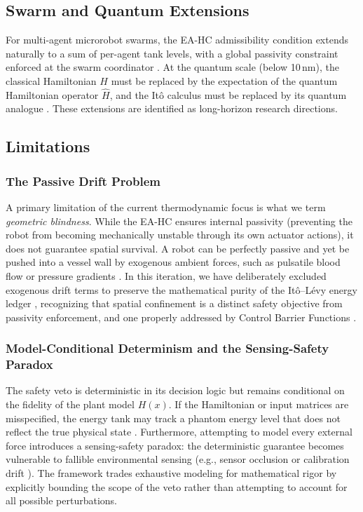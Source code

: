 \documentclass[11pt]{article}
\begin{document}
\subsection{Swarm and Quantum Extensions}

For multi-agent microrobot swarms, the EA-HC admissibility condition extends naturally to a
sum of per-agent tank levels, with a global passivity constraint enforced at the swarm
coordinator \cite{vanderschaft2014,wang2017}. At the quantum scale (below 10\,nm), the
classical Hamiltonian $H$ must be replaced by the expectation of the quantum Hamiltonian
operator $\hat{H}$, and the It\^{o} calculus must be replaced by its quantum analogue
\cite{hudson1984}. These extensions are identified as long-horizon research directions.

\subsection{Limitations}

\subsubsection{The Passive Drift Problem}
\label{sec:drift}

A primary limitation of the current thermodynamic focus is what we term \emph{geometric
blindness}. While the EA-HC ensures internal passivity (preventing the robot from becoming
mechanically unstable through its own actuator actions), it does not guarantee spatial survival.
A robot can be perfectly passive and yet be pushed into a vessel wall by exogenous ambient
forces, such as pulsatile blood flow or pressure gradients \cite{nelson2010,ku1997}. In this
iteration, we have deliberately excluded exogenous drift terms to preserve the mathematical
purity of the It\^{o}--L\'{e}vy energy ledger \cite{applebaum2009}, recognizing that spatial
confinement is a distinct safety objective from passivity enforcement, and one properly
addressed by Control Barrier Functions \cite{ames2017}.

\subsubsection{Model-Conditional Determinism and the Sensing-Safety Paradox}
\label{sec:model-cond}

The safety veto is deterministic in its decision logic but remains conditional on the fidelity
of the plant model $H(x)$. If the Hamiltonian or input matrices are misspecified, the energy
tank may track a phantom energy level that does not reflect the true physical state \cite{ljung1999}.
Furthermore, attempting to model every external force introduces a sensing-safety paradox:
the deterministic guarantee becomes vulnerable to fallible environmental sensing (e.g., sensor
occlusion or calibration drift \cite{thrun2005}). The framework trades exhaustive modeling for
mathematical rigor by explicitly bounding the scope of the veto rather than attempting to
account for all possible perturbations.
\end{document}
